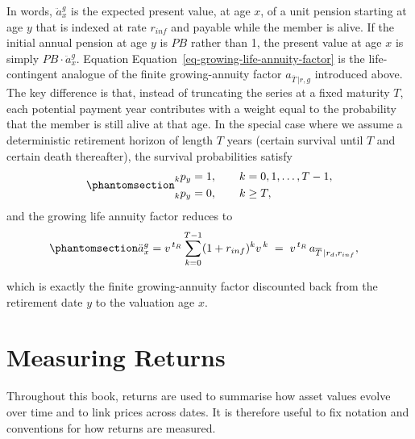 \documentclass[
  letterpaper,
  DIV=11,
  numbers=noendperiod]{scrreprt}
\begin{document}
In words, \(\ddot{a}_x^{g}\) is the expected present value, at age
\(x\), of a unit pension starting at age \(y\) that is indexed at rate
\(r_{inf}\) and payable while the member is alive. If the initial annual
pension at age \(y\) is \(PB\) rather than 1, the present value at age
\(x\) is simply \(PB \cdot \ddot{a}_x^{g}\). Equation
Equation~\ref{eq-growing-life-annuity-factor} is the life-contingent
analogue of the finite growing-annuity factor \(a_{\overline{T}\,|r,g}\)
introduced above. The key difference is that, instead of truncating the
series at a fixed maturity \(T\), each potential payment year
contributes with a weight equal to the probability that the member is
still alive at that age. In the special case where we assume a
deterministic retirement horizon of length \(T\) years (certain survival
until \(T\) and certain death thereafter), the survival probabilities
satisfy \begin{equation}\protect\phantomsection\label{eq-gen-0015}{  
\begin{align}
    {}_k p_y &= 1, \qquad k = 0,1,\dots,T-1, \\
    {}_k p_y &= 0, \qquad k \ge T,
\end{align}
}\end{equation} and the growing life annuity factor reduces to
\begin{equation}\protect\phantomsection\label{eq-gen-0016}{  
\begin{align}
    \ddot{a}_x^{g}
    &= v^{\,t_R} \sum_{k=0}^{T-1} (1 + r_{inf})^{k} v^{\,k}
     \;=\; v^{\,t_R} \, a_{\overline{T}\,|r_d,r_{inf}},
\end{align}
}\end{equation}

which is exactly the finite growing-annuity factor discounted back from
the retirement date \(y\) to the valuation age \(x\).


\chapter{Measuring Returns}\label{sec:measuring_returns}

Throughout this book, returns are used to summarise how asset values
evolve over time and to link prices across dates. It is therefore useful
to fix notation and conventions for how returns are measured.
\end{document}
